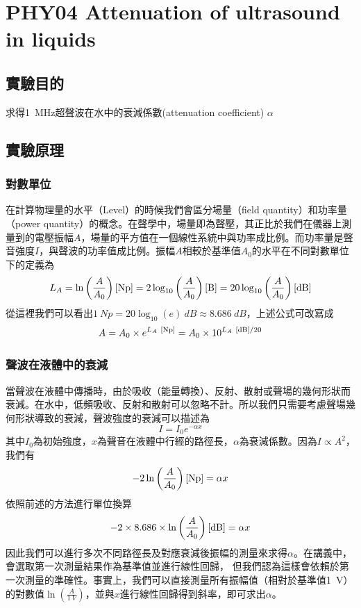 \documentclass[12pt]{report}
\begin{document}
\chapter{PHY04 Attenuation of ultrasound in liquids}\label{PHY04}

\section{實驗目的}
求得\SI{1}{MHz}超聲波在水中的衰減係數(attenuation coefficient) $\alpha$

\section{實驗原理}

\subsection{對數單位}

在計算物理量的水平（Level）的時候我們會區分場量（field quantity）和功率量（power quantity）的概念。在聲學中，場量即為聲壓，其正比於我們在儀器上測量到的電壓振幅$A$，場量的平方值在一個線性系統中與功率成比例。而功率量是聲音強度$I$，與聲波的功率值成比例。振幅$A$相較於基準值$A_0$的水平在不同對數單位下的定義為
\begin{equation}
    L_A = \ln\left(\frac{A}{A_0}\right)[{\rm Np}] = 2\log_{10} \left(\frac{A}{A_0}\right) [{\rm B}] = 20\log_{10} \left(\frac{A}{A_0}\right) [{\rm dB}]
\end{equation}
從這裡我們可以看出$\SI{1}{Np}=20\log_{10}(e)\ \si{dB}\approx \SI{8.686}{dB}$，上述公式可改寫成
\begin{equation}
    A = A_0\times e^{L_A\ [{\rm Np}]} = A_0\times 10^{L_A\ [{\rm dB}]/20}
\end{equation}

\subsection{聲波在液體中的衰減}
當聲波在液體中傳播時，由於吸收（能量轉換）、反射、散射或聲場的幾何形狀而衰減。在水中，低頻吸收、反射和散射可以忽略不計。所以我們只需要考慮聲場幾何形狀導致的衰減，聲波強度的衰減可以描述為
\begin{equation}
    I=I_0 e^{-\alpha x}
\end{equation}
其中$I_0$為初始強度，$x$為聲音在液體中行經的路徑長，$\alpha$為衰減係數。因為$I\propto A^2$，我們有
\begin{equation}
-2\ln\left(\frac{A}{A_0}\right) [{\rm Np}] = \alpha x
\end{equation}
依照前述的方法進行單位換算
\begin{equation}\label{eqn:attenuation}
-2\times 8.686 \times \ln\left(\frac{A}{A_0}\right) [{\rm dB}] = \alpha x
\end{equation}
因此我們可以進行多次不同路徑長及對應衰減後振幅的測量來求得$\alpha$。在講義中，會選取第一次測量結果作為基準值並進行線性回歸，
但我們認為這樣會依賴於第一次測量的準確性。事實上，我們可以直接測量所有振幅值（相對於基準值\SI{1}{V}）的對數值$\ln\left(\frac{A}{\SI{1}{V}}\right)$，並與$x$進行線性回歸得到斜率，即可求出$\alpha$。
\end{document}
